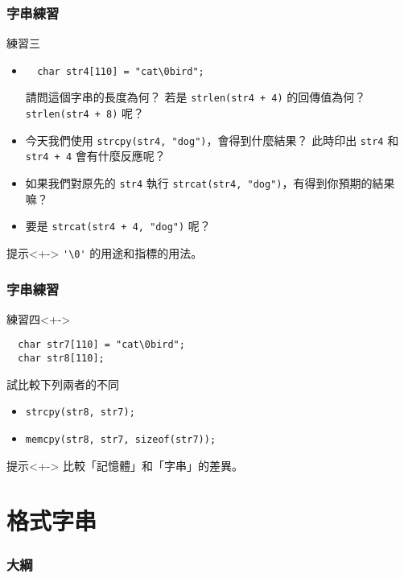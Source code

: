 \documentclass[utf8]{beamer}
\begin{document}
\begin{CJK}{UTF8}{bkai}
\begin{frame}[fragile]
  \frametitle{字串練習}
  \begin{block}{練習三}
    \begin{itemize}[<+->]
    \item
      \begin{lstlisting}
  char str4[110] = "cat\0bird";
      \end{lstlisting}
      請問這個字串的長度為何？\onslide<+-> 若是 \lstinline{strlen(str4 + 4)}{} 的回傳值為何？\onslide<+-> \lstinline{strlen(str4 + 8)}{} 呢？
    \item 今天我們使用 \lstinline{strcpy(str4, "dog")}{}，會得到什麼結果？\onslide<+-> 此時印出 \lstinline{str4}{} 和 \lstinline{str4 + 4}{} 會有什麼反應呢？
    \item 如果我們對原先的 \lstinline{str4}{} 執行 \lstinline{strcat(str4, "dog")}{}，有得到你預期的結果嘛？
    \item 要是 \lstinline{strcat(str4 + 4, "dog")}{} 呢？ 
    \end{itemize}
  \end{block}
  \begin{exampleblock}{提示}<+->
  \lstinline{'\0'}{} 的用途和指標的用法。
  \end{exampleblock}
\end{frame}

\begin{frame}[fragile]
  \frametitle{字串練習}
  \begin{block}{練習四}<+->
    \begin{lstlisting}
  char str7[110] = "cat\0bird";
  char str8[110];
    \end{lstlisting}
  試比較下列兩者的不同
    \begin{itemize}
    \item \lstinline{strcpy(str8, str7);}{}
    \item \lstinline{memcpy(str8, str7, sizeof(str7));}{}
    \end{itemize}
  \end{block}
  \begin{exampleblock}{提示}<+->
  比較「記憶體」和「字串」的差異。
  \end{exampleblock}
\end{frame}

\section{格式字串}
\begin{frame}
  \frametitle{大綱}
  \begin{multicols}{2}
    \tableofcontents[currentsection]
  \end{multicols}
\end{frame}


\end{CJK}
\end{document}

